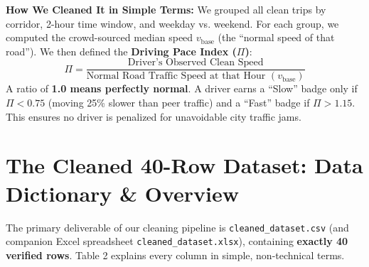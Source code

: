 \documentclass[10pt, a4paper]{article}
\begin{document}
\textbf{How We Cleaned It in Simple Terms:}
We grouped all clean trips by corridor, 2-hour time window, and weekday vs. weekend. For each group, we computed the crowd-sourced median speed \(v_{\mathrm{base}}\) (the ``normal speed of that road''). We then defined the \textbf{Driving Pace Index (\(\Pi\))}:
\begin{equation*}
\Pi = \frac{\text{Driver's Observed Clean Speed}}{\text{Normal Road Traffic Speed at that Hour } (v_{\mathrm{base}})}
\end{equation*}
A ratio of \textbf{1.0 means perfectly normal}. A driver earns a ``Slow'' badge only if \(\Pi < 0.75\) (moving 25\% slower than peer traffic) and a ``Fast'' badge if \(\Pi > 1.15\). This ensures no driver is penalized for unavoidable city traffic jams.

\newpage


\section{The Cleaned 40-Row Dataset: Data Dictionary \& Overview}

The primary deliverable of our cleaning pipeline is \texttt{cleaned\_dataset.csv} (and companion Excel spreadsheet \texttt{cleaned\_dataset.xlsx}), containing \textbf{exactly 40 verified rows}. Table 2 explains every column in simple, non-technical terms.
\end{document}
